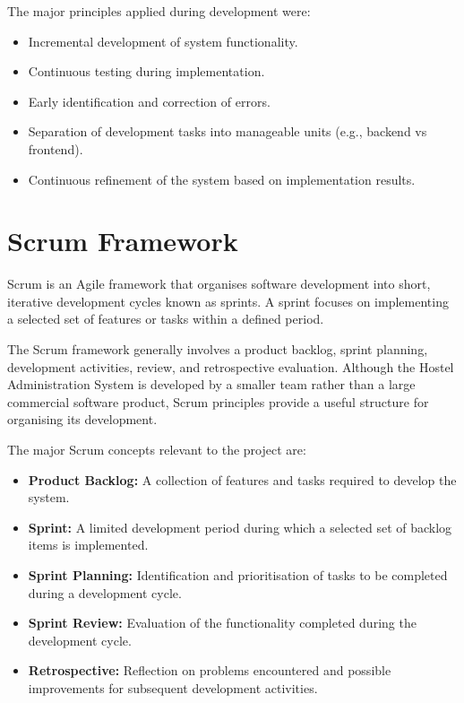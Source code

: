 The major principles applied during development were:

\begin{itemize}
    \item Incremental development of system functionality.
    \item Continuous testing during implementation.
    \item Early identification and correction of errors.
    \item Separation of development tasks into manageable units (e.g., backend vs frontend).
    \item Continuous refinement of the system based on implementation results.
\end{itemize}

\section{Scrum Framework}

Scrum is an Agile framework that organises software development into short, iterative development cycles known as sprints. A sprint focuses on implementing a selected set of features or tasks within a defined period.

The Scrum framework generally involves a product backlog, sprint planning, development activities, review, and retrospective evaluation. Although the Hostel Administration System is developed by a smaller team rather than a large commercial software product, Scrum principles provide a useful structure for organising its development.

The major Scrum concepts relevant to the project are:

\begin{itemize}
    \item \textbf{Product Backlog:} A collection of features and tasks required to develop the system.
    
    \item \textbf{Sprint:} A limited development period during which a selected set of backlog items is implemented.
    
    \item \textbf{Sprint Planning:} Identification and prioritisation of tasks to be completed during a development cycle.
    
    \item \textbf{Sprint Review:} Evaluation of the functionality completed during the development cycle.
    
    \item \textbf{Retrospective:} Reflection on problems encountered and possible improvements for subsequent development activities.
\end{itemize}

